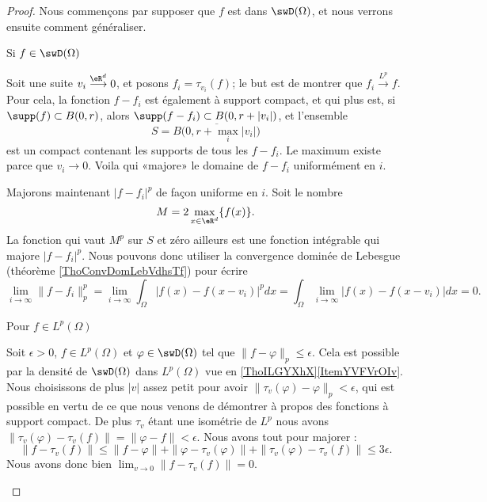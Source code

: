 \begin{proof}
    Nous commençons par supposer que \( f\) est dans \( \swD(\Omega)\), et nous verrons ensuite comment généraliser. 
    
    \begin{subproof}
        \item[Si \( f\in\swD(\Omega)\)]

            Soit une suite \( v_i\stackrel{\eR^d}{\longrightarrow}0\), et posons \( f_i=\tau_{v_i}(f)\); le but est de montrer que \( f_i\stackrel{L^p}{\longrightarrow}f\). Pour cela, la fonction \( f-f_i\) est également à support compact, et qui plus est, si \( \supp(f)\subset B(0,r)\), alors \( \supp(f-f_i)\subset B(0,r+| v_i |)\), et l'ensemble
            \begin{equation}
                S=\overline{B \big( 0,r+\max_i| v_i | \big)}
            \end{equation}
            est un compact contenant les supports de tous les \( f-f_i\). Le maximum existe parce que \( v_i\to 0\). Voila qui «majore» le domaine de \( f-f_i\) uniformément en \( i\).

            Majorons maintenant \( | f-f_i |^p\) de façon uniforme en \( i\). Soit le nombre 
            \begin{equation}
                M=2\max_{x\in \eR^d}\{ f(x) \}.
            \end{equation}
            La fonction qui vaut \( M^p\) sur \( S\) et zéro ailleurs est une fonction intégrable qui majore \( | f-f_i |^p\). Nous pouvons donc utiliser la convergence dominée de Lebesgue (théorème \ref{ThoConvDomLebVdhsTf}) pour écrire
            \begin{equation}
                \lim_{i\to \infty} \| f-f_i \|^p_p=\lim_{i\to \infty} \int_{\Omega} | f(x)-f(x-v_i) |^pdx=\int_{\Omega}\lim_{i\to \infty} | f(x)-f(x-v_i) |dx=0.
            \end{equation}
            
        \item[Pour \( f\in L^p(\Omega)\)]

            Soit \( \epsilon>0\), \( f\in L^p(\Omega)\) et \( \varphi\in\swD(\Omega)\) tel que \(  \| f-\varphi \|_p\leq \epsilon\). Cela est possible par la densité de \( \swD(\Omega)\) dans \( L^p(\Omega)\) vue en \ref{ThoILGYXhX}\ref{ItemYVFVrOIv}. Nous choisissons de plus \( | v |\) assez petit pour avoir \( \| \tau_v(\varphi)-\varphi \|_p<\epsilon\), qui est possible en vertu de ce que nous venons de démontrer à propos des fonctions à support compact. De plus \( \tau_v\) étant une isométrie de \( L^p\) nous avons \( \| \tau_v(\varphi)-\tau_v(f) \|=\| \varphi-f \|<\epsilon\). Nous avons tout pour majorer :
            \begin{equation}
                \| f-\tau_v(f) \|\leq \| f-\varphi \|+\| \varphi-\tau_v(\varphi) \|+\| \tau_v(\varphi)-\tau_v(f) \|\leq 3\epsilon.
            \end{equation}
            Nous avons donc bien \( \lim_{v\to 0} \| f-\tau_v(f) \|=0\).
    \end{subproof}
\end{proof}
